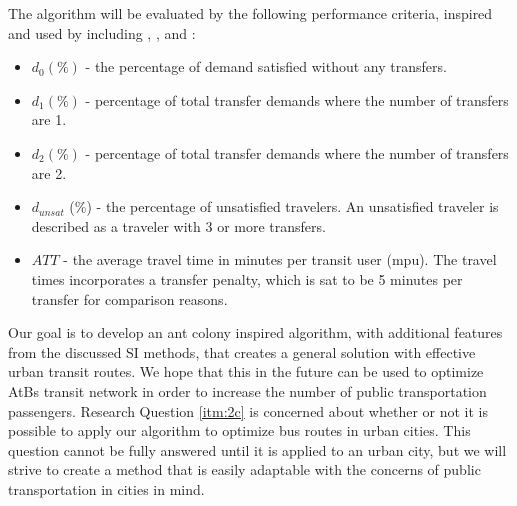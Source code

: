 The algorithm will be evaluated by the following performance criteria, inspired and used by including \citep{kechagiopoulos14}, \citep{mandl80}, \citep{nikolic14} and \citep{fan09}: 
\begin{itemize}
\item $d_0 (\%)$ - the percentage of demand satisfied without any transfers.
\item $d_1 (\%)$ - percentage of total transfer demands where the number of transfers are 1. 
\item $d_2 (\%)$ - percentage of total transfer demands where the number of transfers are 2. 
\item $d_{unsat}$ (\%) - the percentage of unsatisfied travelers. An unsatisfied traveler is described as a traveler with 3 or more transfers.
\item $ATT$  - the average travel time in minutes per transit user (mpu). The travel times incorporates a transfer penalty, which is sat to be 5 minutes per transfer for comparison reasons.
\end{itemize}

Our goal is to develop an ant colony inspired algorithm, with additional features from the discussed SI methods, that creates a general solution with effective urban transit routes. We hope that this in the future can be used to optimize AtBs transit network in order to increase the number of public transportation passengers. Research Question \vref{itm:2c} is concerned about whether or not it is possible to apply our algorithm to optimize bus routes in urban cities. This question cannot be fully answered until it is applied to an urban city, but we will strive to create a method that is easily adaptable with the concerns of public transportation in cities in mind.
